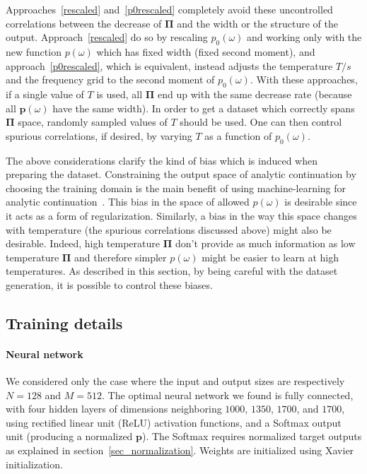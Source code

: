 \documentclass[notitlepage,11pt,nofootinbib]{revtex4-1}
\renewcommand{\vec}[1]{\bm{#1}}
\begin{document}
Approaches~\ref{rescaled} and~\ref{p0rescaled} completely avoid these uncontrolled correlations between the decrease of $\vec \Pi$ and the width or the structure of the output. Approach~\ref{rescaled} do so by rescaling $p_0(\omega)$ and working only with the new function $p(\omega)$ which has fixed width (fixed second moment), and approach~\ref{p0rescaled}, which is equivalent, instead adjusts the temperature $T/s$ and the frequency grid to the second moment of $p_0(\omega)$.
With these approaches, if a single value of $T$ is used, all $\vec \Pi$ end up with the same decrease rate (because all $\vec p(\omega)$ have the same width). In order to get a dataset which correctly spans $\vec \Pi$ space, randomly sampled values of $T$ should be used. One can then control spurious correlations, if desired, by varying $T$ as a function of $p_0(\omega)$.

The above considerations clarify the kind of bias which is induced when preparing the dataset. Constraining the output space of analytic continuation by choosing the training domain is the main benefit of using machine-learning for analytic continuation~\cite{Arsenault2017}. This bias in the space of allowed $p(\omega)$ is desirable since it acts as a form of regularization. Similarly, a bias in the way this space changes with temperature (the spurious correlations discussed above) might also be desirable. Indeed, high temperature $\vec \Pi$ don't provide as much information as low temperature $\vec \Pi$ and therefore simpler $p(\omega)$ might be easier to learn at high temperatures. As described in this section, by being careful with the dataset generation, it is possible to control these biases.

\subsection{Training details}
\label{sec_training}

\paragraph*{Neural network} We considered only the case where the input and output sizes are respectively $N=128$ and $M=512$. The optimal neural network we found is fully connected, with four hidden layers of dimensions neighboring $1000$, $1350$, $1700$, and $1700$, using rectified linear unit (ReLU) activation functions, and a Softmax output unit (producing a normalized $\vec p$). The Softmax requires normalized target outputs as explained in section~\ref{sec_normalization}. Weights are initialized using Xavier initialization.
\end{document}
